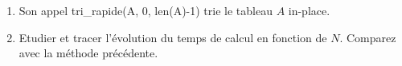\documentclass[a4paper, 12pt]{article}
\begin{document}
\begin{enumerate}
\item Son appel 
tri\_rapide(A, 0, len(A)-1) trie le tableau $A$ in-place.


%


\item Etudier et tracer l'évolution du temps de calcul en fonction de $N$.
Comparez avec la méthode précédente.

\end{enumerate} 
\end{document}
